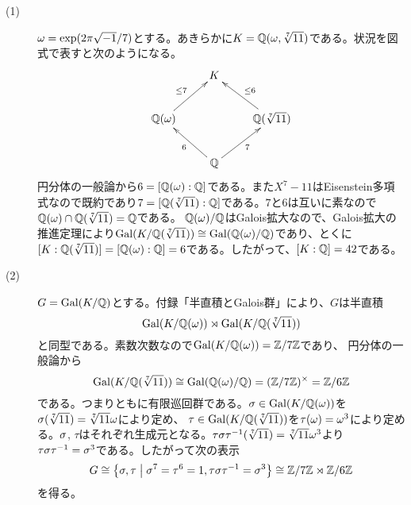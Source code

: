 \subsubsection{} %
\begin{sol} ${}$
\begin{description}
  \item[(1)] ${\omega} = \exp (2\pi \sqrt{-1}/7)$とする。あきらかに$K = {\mathbb Q}({\omega}, \sqrt[7]{11})$である。状況を図式で表すと次のようになる。
  \[
  \xymatrix{& K &  \\  \Q(\gro) \ar[ur]^{\leq 7} & & \Q(\sqrt[7]{11}) \ar[ul]_{\leq 6} \\  &  \Q \ar[ul]^{6} \ar[ur]_{7} &
  }
  \]
  円分体の一般論から$6= [{\mathbb Q}({\omega}):{\mathbb Q}]$である。また$X^7 - 11$はEisenstein多項式なので既約であり$7=[{\mathbb Q}(\sqrt[7]{11}):{\mathbb Q}]$である。$7$と$6$は互いに素なので${\mathbb Q}({\omega}) \cap {\mathbb Q}(\sqrt[7]{11}) = {\mathbb Q}$である。
  ${\mathbb Q}({\omega}) / {\mathbb Q}$はGalois拡大なので、Galois拡大の推進定理により$\operatorname{Gal}(K/ {\mathbb Q}(\sqrt[7]{11})) \cong \operatorname{Gal}({\mathbb Q}({\omega}) / {\mathbb Q})$であり、とくに$[K: {\mathbb Q}(\sqrt[7]{11})] = [{\mathbb Q}({\omega}):{\mathbb Q}] = 6$である。したがって、$[K:{\mathbb Q}]=42$である。
  \item[(2)] $G = \operatorname{Gal}(K/ {\mathbb Q})$とする。付録「半直積とGalois群」により、$G$は半直積
  \[
\operatorname{Gal}(K/ {\mathbb Q}({\omega})) \rtimes \operatorname{Gal}(K/ {\mathbb Q}(\sqrt[7]{11}))
  \]
  と同型である。素数次数なので$\operatorname{Gal}(K/ {\mathbb Q}({\omega})) = {\mathbb Z} / 7 {\mathbb Z}$であり、
  円分体の一般論から
\[
\operatorname{Gal}(K/ {\mathbb Q}(\sqrt[7]{11})) \cong \operatorname{Gal}({\mathbb Q}({\omega}) / {\mathbb Q}) = ({\mathbb Z} / 7 {\mathbb Z})^{\times} = {\mathbb Z} / 6 {\mathbb Z}
\]
  である。つまりともに有限巡回群である。${\sigma} \in \operatorname{Gal}(K/ {\mathbb Q}({\omega}))$を${\sigma}(\sqrt[7]{11}) = \sqrt[7]{11} {\omega}$により定め、
  $\tau \in \operatorname{Gal}(K/ {\mathbb Q}(\sqrt[7]{11}))$を$\tau({\omega}) = {\omega}^3$により定める。${\sigma}$, $\tau$はそれぞれ生成元となる。$\tau {\sigma} \tau^{-1}(\sqrt[7]{11}) = \sqrt[7]{11} {\omega}^3$より
  $\tau {\sigma} \tau^{-1} = {\sigma}^3$である。したがって次の表示
  \[
  G \cong \left\{ {\sigma},\tau \mathrel{} \middle| \mathrel{} {\sigma}^7 = \tau^6 = 1, \tau {\sigma} \tau^{-1} = {\sigma}^3 \right\} \cong {\mathbb Z} / 7 {\mathbb Z} \rtimes {\mathbb Z} / 6 {\mathbb Z}
  \]
  を得る。


\end{description}
\end{sol}
